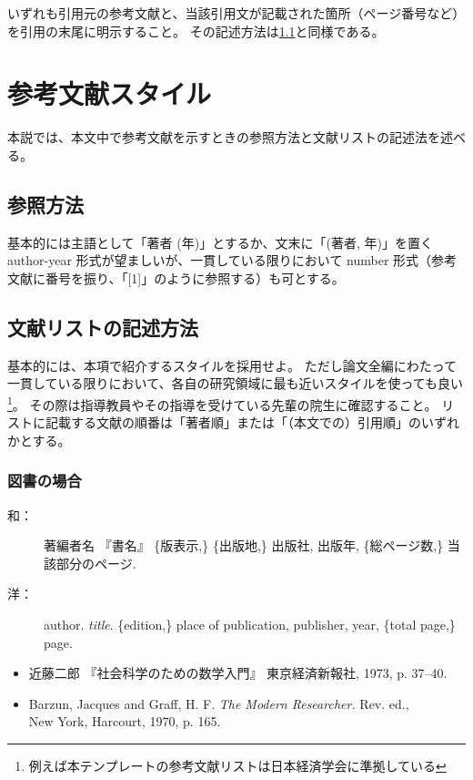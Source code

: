 			\noindent
			いずれも引用元の参考文献と、当該引用文が記載された箇所（ページ番号など）を引用の末尾に明示すること。
			その記述方法は\cref{sub:ref_style}と同様である。


  \section{参考文献スタイル}
		\label{sec:bib_style}

	  本説では、本文中で参考文献を示すときの参照方法と文献リストの記述法を述べる。

		\subsection{参照方法}
			\label{sub:ref_style}

		  基本的には主語として「著者 (年)」とするか、文末に「(著者, 年)」を置く author-year 形式が望ましいが、一貫している限りにおいて number 形式（参考文献に番号を振り、「[1]」のように参照する）も可とする。

		\subsection{文献リストの記述方法}
			\label{sub:ref_list_sylte}

		  基本的には、本項で紹介するスタイルを採用せよ。
			ただし論文全編にわたって一貫している限りにおいて、各自の研究領域に最も近いスタイルを使っても良い
      \footnote{例えば本テンプレートの参考文献リストは日本経済学会に準拠している}。
			その際は指導教員やその指導を受けている先輩の院生に確認すること。
      リストに記載する文献の順番は「著者順」または「（本文での）引用順」のいずれかとする。


		\subsubsection{図書の場合}

			\begin{description}
				\item[和：] 著編者名 『書名』 \{版表示,\} \{出版地,\} 出版社, 出版年, \{総ページ数,\} 当該部分のページ.
				\item[洋：] author. \textit{title}. \{edition,\} place of publication, publisher, year, \{total page,\} page.
			\end{description}

			\begin{screen} \begin{itemize}
				\item 近藤二郎 『社会科学のための数学入門』 東京経済新報社, 1973,
				p. 37--40.

				\item Barzun, Jacques and Graff, H. F. \textit{The Modern Researcher.}
				Rev. ed., \\New York, Harcourt, 1970, p. 165.
			\end{itemize} \end{screen}


